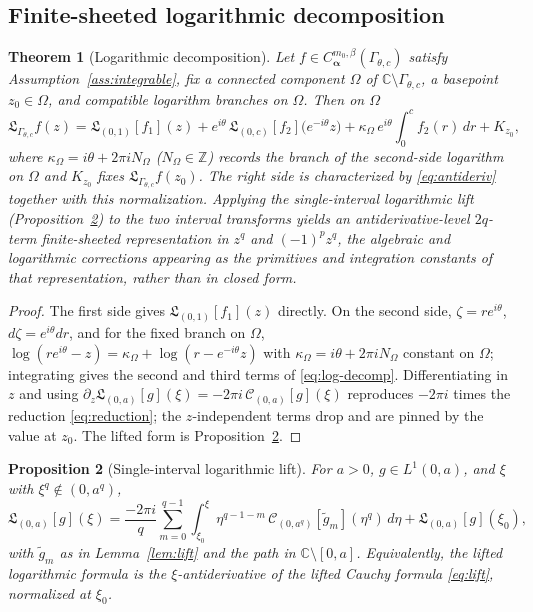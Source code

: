 \documentclass[pdflatex,sn-mathphys-num]{sn-jnl}%
\newcommand{\C}{\mathbb{C}}
\newcommand{\Z}{\mathbb{Z}}
\newcommand{\Cau}{\mathcal{C}}
\newcommand{\Lcx}{\mathfrak{L}}
\newcommand{\Gw}{\Gamma_{\theta,c}}
\newcommand{\bd}{\boldsymbol}
\theoremstyle{thmstyleone}
\newtheorem{theorem}{Theorem}
\newtheorem{proposition}[theorem]{Proposition}%
\theoremstyle{thmstyletwo}
\theoremstyle{thmstylethree}
\begin{document}
\subsection{Finite-sheeted logarithmic decomposition}

\begin{theorem}[Logarithmic decomposition]\label{thm:log}
Let $f\in C^{m_0,\beta}_{\bd\alpha}(\Gw)$ satisfy
Assumption~\ref{ass:integrable}, fix a connected component $\Omega$ of
$\C\setminus\Gw$, a basepoint $z_0\in\Omega$, and compatible logarithm branches
on $\Omega$. Then on $\Omega$
\begin{equation}\label{eq:log-decomp}
  \Lcx_{\Gw}f(z)
  =\Lcx_{(0,1)}[f_1](z)
   +e^{i\theta}\,\Lcx_{(0,c)}[f_2]\!\bigl(e^{-i\theta}z\bigr)
   +\kappa_\Omega\,e^{i\theta}\!\!\int_0^c f_2(r)\,dr
   +K_{z_0},
\end{equation}
where $\kappa_\Omega=i\theta+2\pi iN_\Omega$ ($N_\Omega\in\Z$) records the
branch of the second-side logarithm on $\Omega$ and $K_{z_0}$ fixes
$\Lcx_{\Gw}f(z_0)$. The right side is characterized by \eqref{eq:antideriv}
together with this normalization. Applying the single-interval logarithmic lift
(Proposition~\ref{prop:log-lift}) to the two interval transforms yields an
antiderivative-level $2q$-term finite-sheeted representation in $z^{q}$ and
$(-1)^{p}z^{q}$, the algebraic and logarithmic corrections appearing as the
primitives and integration constants of that representation, rather than in
closed form.
\end{theorem}

\begin{proof}
The first side gives $\Lcx_{(0,1)}[f_1](z)$ directly. On the second side,
$\zeta=re^{i\theta}$, $d\zeta=e^{i\theta}dr$, and for the fixed branch on
$\Omega$, $\log(re^{i\theta}-z)=\kappa_\Omega+\log(r-e^{-i\theta}z)$ with
$\kappa_\Omega=i\theta+2\pi iN_\Omega$ constant on $\Omega$; integrating gives
the second and third terms of \eqref{eq:log-decomp}. Differentiating in $z$ and
using $\partial_z\Lcx_{(0,a)}[g](\xi)=-2\pi i\,\Cau_{(0,a)}[g](\xi)$ reproduces
$-2\pi i$ times the reduction \eqref{eq:reduction}; the $z$-independent terms
drop and are pinned by the value at $z_0$. The lifted form is
Proposition~\ref{prop:log-lift}.
\end{proof}

\begin{proposition}[Single-interval logarithmic lift]\label{prop:log-lift}
For $a>0$, $g\in L^1(0,a)$, and $\xi$ with $\xi^{q}\notin(0,a^{q})$,
\begin{equation}\label{eq:log-lift}
  \Lcx_{(0,a)}[g](\xi)
  =\frac{-2\pi i}{q}\sum_{m=0}^{q-1}\int_{\xi_0}^{\xi}\eta^{q-1-m}\,
     \Cau_{(0,a^{q})}[\tilde g_m](\eta^{q})\,d\eta
   +\Lcx_{(0,a)}[g](\xi_0),
\end{equation}
with $\tilde g_m$ as in Lemma~\ref{lem:lift} and the path in $\C\setminus[0,a]$.
Equivalently, the lifted logarithmic formula is the $\xi$-antiderivative of the
lifted Cauchy formula \eqref{eq:lift}, normalized at $\xi_0$.
\end{proposition}
\end{document}
